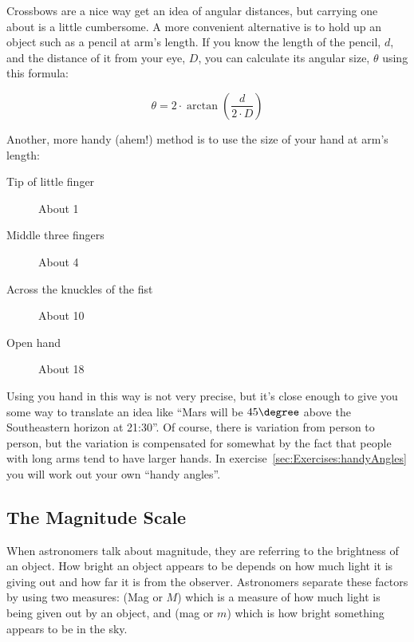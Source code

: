 
Crossbows are a nice way get an idea of angular distances, but carrying
one about is a little cumbersome. A more convenient alternative is to
hold up an object such as a pencil at arm's length. If you know the
length of the pencil, $d$, and the distance of it from your eye, $D$, you
can calculate its angular size, $\theta$ using this formula:

\begin{equation}
\label{eq:handyAngle}
\theta=2 \cdot \arctan{\left(\frac{d}{2 \cdot D}\right) }
\end{equation}


\noindent Another, more handy (ahem!) method is to use the size of your hand at
arm's length:

\begin{description}
\item[Tip of little finger] About 1\degree 
\item[Middle three fingers] About 4\degree 
\item[Across the knuckles of the fist] About 10\degree 
\item[Open hand] About 18\degree
\end{description}

Using you hand in this way is not very precise, but it's close enough
to give you some way to translate an idea like ``Mars will be
$45\degree$ above the Southeastern horizon at 21:30''. Of course,
there is variation from person to person, but the variation is
compensated for somewhat by the fact that people with long arms tend
to have larger hands. In exercise~\ref{sec:Exercises:handyAngles} you
will work out your own ``handy angles''.



\subsection{The Magnitude Scale}
\label{sec:Concepts:Magnitudes}


When astronomers talk about magnitude, they are referring to the
brightness of an object. How bright an object appears to be depends on
how much light it is giving out and how far it is from the observer.
Astronomers separate these factors by using two measures:  (Mag or $M$) which is a measure of how much light is being
given out by an object, and  (mag or $m$) which
is how bright something appears to be in the sky.

